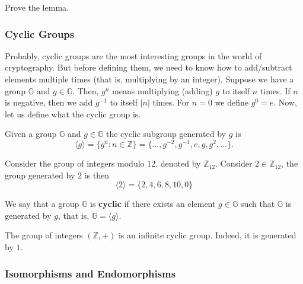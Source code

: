 \documentclass[../lecture-notes.tex]{subfiles}
\begin{document}
\begin{exercise}
    Prove the lemma.
\end{exercise}

\subsubsection{Cyclic Groups}

Probably, cyclic groups are the most interesting groups in the world of cryptography. But before defining them, we need to know how to add/subtract elements multiple times (that is, multiplying by an integer). Suppose 
we have a group $\mathbb{G}$ and $g \in \mathbb{G}$. Then, $g^n$ means multiplying (adding) $g$ to itself $n$ times. If $n$ is negative, then we add $g^{-1}$ to itself $|n|$ times. For $n=0$ we define $g^0 = e$. Now, let us define what the cyclic group is.
\begin{definition}
    Given a group $\mathbb{G}$ and $g \in \mathbb{G}$ the cyclic subgroup generated by $g$ is
    \begin{equation*}
        \langle g \rangle = \{g^n: n \in \mathbb{Z}\} = \{\dots, g^{-2}, g^{-1}, e, g, g^2, \dots\}.
    \end{equation*}
\end{definition}

\begin{example}
    Consider the group of integers modulo $12$, denoted by $\mathbb{Z}_{12}$. Consider $2 \in \mathbb{Z}_{12}$, the group generated by $2$ is then
    \begin{equation*}
        \langle 2 \rangle = \{2,4,6,8,10, 0\}
    \end{equation*}
\end{example}

\begin{definition}
    We say that a group $\mathbb{G}$ is \textbf{cyclic} if there exists an element $g \in \mathbb{G}$ such that $\mathbb{G}$ is generated by $g$, that is, $\mathbb{G} = \langle g \rangle$.
\end{definition}

\begin{example}
    The group of integers $(\mathbb{Z},+)$ is an infinite cyclic group. Indeed, it is generated by $1$.
\end{example}

\subsubsection{Isomorphisms and Endomorphisms}
\end{document}
